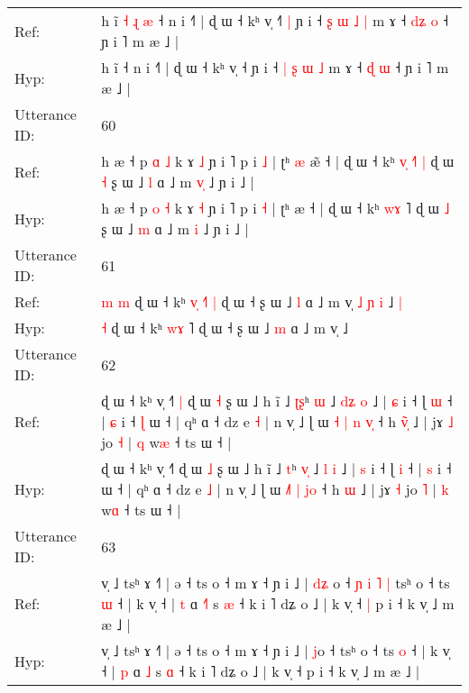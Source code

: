 \documentclass[10pt]{article}
\DeclareRobustCommand{\hl}[1]{{\textcolor{red}{#1}}}
\begin{document}
\begin{longtable}{ll}
Ref: & h ĩ\hl{ }\hl{˧}\hl{ }\hl{ɻ}\hl{ }\hl{æ} ˧ n i ˧˥ | ɖ ɯ ˧ kʰ v̩ ˧\hl{˥}\hl{ }\hl{|} ɲ i ˧ \hl{ʂ} \hl{ɯ} \hl{˩} \hl{|} m ɤ ˧ \hl{d}\hl{ʑ} \hl{o} ˧ ɲ i ˥ m æ ˩ |
 \\
Hyp: & h ĩ\hl{}\hl{}\hl{}\hl{}\hl{}\hl{} ˧ n i ˧˥ | ɖ ɯ ˧ kʰ v̩ ˧\hl{}\hl{}\hl{} ɲ i ˧ \hl{|} \hl{ʂ} \hl{ɯ} \hl{˩} m ɤ ˧ \hl{}\hl{ɖ} \hl{ɯ} ˧ ɲ i ˥ m æ ˩ |
 \\
\midrule
Utterance ID: & 60 \\
Ref: & h æ ˧ p \hl{ɑ} \hl{˩} k ɤ \hl{˩} ɲ i ˥ p i \hl{˩} | ʈʰ\hl{ }\hl{æ} æ\hl{̃} ˧ | ɖ ɯ ˧ kʰ \hl{v}\hl{̩} \hl{˧}˥\hl{ }\hl{|} ɖ ɯ \hl{˧} ʂ ɯ ˩ \hl{l} ɑ ˩ m \hl{v}\hl{̩} ˩ ɲ i ˩ |
 \\
Hyp: & h æ ˧ p \hl{o} \hl{˧} k ɤ \hl{˧} ɲ i ˥ p i \hl{˧} | ʈʰ\hl{}\hl{} æ\hl{} ˧ | ɖ ɯ ˧ kʰ \hl{w}\hl{ɤ} \hl{}˥\hl{}\hl{} ɖ ɯ \hl{˩} ʂ ɯ ˩ \hl{m} ɑ ˩ m \hl{}\hl{i} ˩ ɲ i ˩ |
 \\
\midrule
Utterance ID: & 61 \\
Ref: & \hl{m}\hl{ }\hl{m} ɖ ɯ ˧ kʰ \hl{v}\hl{̩} \hl{˧}˥\hl{ }\hl{|} ɖ ɯ ˧ ʂ ɯ ˩ \hl{l} ɑ ˩ m v̩\hl{ }\hl{˩}\hl{ }\hl{ɲ}\hl{ }\hl{i} ˩\hl{ }\hl{|}
 \\
Hyp: & \hl{}\hl{}\hl{˧} ɖ ɯ ˧ kʰ \hl{w}\hl{ɤ} \hl{}˥\hl{}\hl{} ɖ ɯ ˧ ʂ ɯ ˩ \hl{m} ɑ ˩ m v̩\hl{}\hl{}\hl{}\hl{}\hl{}\hl{} ˩\hl{}\hl{}
 \\
\midrule
Utterance ID: & 62 \\
Ref: & ɖ ɯ ˧ kʰ v̩ ˧˥\hl{ }\hl{|} ɖ ɯ \hl{˧} ʂ ɯ ˩ h ĩ ˩ \hl{ʈ}\hl{ʂ}ʰ \hl{}\hl{ɯ} ˩ \hl{d}\hl{ʑ} \hl{o} ˩ | \hl{ɕ} i ˧ ɭ \hl{ɯ} ˧ | \hl{ɕ} i ˧\hl{ }\hl{ɭ} ɯ ˧ | qʰ ɑ ˧ dz e \hl{˧} | n v̩ ˩ ɭ ɯ \hl{˧}\hl{ }\hl{|} \hl{n} \hl{v}\hl{̩} ˧ h \hl{v}\hl{̃}\hl{̩} ˩ | jɤ \hl{˩} jo \hl{˧} | \hl{q} w\hl{æ} ˧ ts ɯ ˧ |
 \\
Hyp: & ɖ ɯ ˧ kʰ v̩ ˧˥\hl{}\hl{} ɖ ɯ \hl{˩} ʂ ɯ ˩ h ĩ ˩ \hl{}\hl{t}ʰ \hl{v}\hl{̩} ˩ \hl{}\hl{l} \hl{i} ˩ | \hl{s} i ˧ ɭ \hl{i} ˧ | \hl{s} i ˧\hl{}\hl{} ɯ ˧ | qʰ ɑ ˧ dz e \hl{˩} | n v̩ ˩ ɭ ɯ \hl{}\hl{˩}\hl{˥} \hl{|} \hl{j}\hl{o} ˧ h \hl{}\hl{}\hl{ɯ} ˩ | jɤ \hl{˧} jo \hl{˥} | \hl{k} w\hl{ɑ} ˧ ts ɯ ˧ |
 \\
\midrule
Utterance ID: & 63 \\
Ref: & v̩ ˩ tsʰ ɤ ˧˥ | ə ˧ ts o ˧ m ɤ ˧ ɲ i ˩ | \hl{d}\hl{ʑ}\hl{ }o ˧\hl{ }\hl{ɲ}\hl{ }\hl{i}\hl{ }\hl{˥}\hl{ }\hl{|} tsʰ o ˧ ts \hl{ɯ} ˧ | k v̩ ˧ | \hl{t} ɑ \hl{˧}\hl{˥} s \hl{æ} ˧ k i ˥ dʑ o ˩ | k v̩ ˧\hl{ }\hl{|} p i ˧ k v̩ ˩ m æ ˩ |
 \\
Hyp: & v̩ ˩ tsʰ ɤ ˧˥ | ə ˧ ts o ˧ m ɤ ˧ ɲ i ˩ | \hl{}\hl{}\hl{j}o ˧\hl{}\hl{}\hl{}\hl{}\hl{}\hl{}\hl{}\hl{} tsʰ o ˧ ts \hl{o} ˧ | k v̩ ˧ | \hl{p} ɑ \hl{}\hl{˩} s \hl{ɑ} ˧ k i ˥ dʑ o ˩ | k v̩ ˧\hl{}\hl{} p i ˧ k v̩ ˩ m æ ˩ |

\end{longtable}
\end{document}
